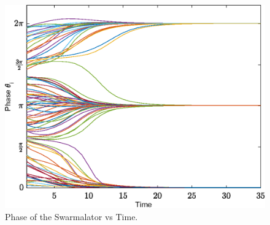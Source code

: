 \documentclass[twocolumn,10pt]{asme2ej}
\begin{document}
{{        \begin{figure}
            \includegraphics[width = \linewidth]{phasevstimeN_100.eps}
            \caption{Phase of the Swarmalator vs Time. }
            \label{fig:phasevsTime}
        \end{figure}
    }
    
}
\end{document}
